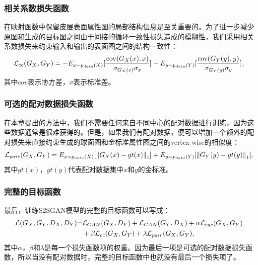 \subsubsection{相关系数损失函数}
在映射函数中保留皮层表面属性图的局部结构信息是至关重要的。为了进一步减少原图和生成的目标图之间由于间接的循环一致性损失造成的模糊性，我们采用相关系数损失来约束输入和输出的表面图之间的结构一致性：
\begin{equation}
	{{\cal L}_{cc}}({G_X},{G_Y}) =  - {E_{x\sim{p_{data}}(X)}}[\frac{{{\mathop{\rm cov}} ({G_X}(x),x)}}{{{\sigma _{{G_X}(x)}}{\sigma _x}}}] - {E_{y\sim{p_{data}}(Y)}}[\frac{{{\mathop{\rm cov}} ({G_Y}(y),y)}}{{{\sigma _{{G_Y}(y)}}{\sigma _y}}}],
\end{equation}
其中$cov$表示协方差，$\sigma$表示标准差。
	
\subsubsection{可选的配对数据损失函数}
在本章提出的方法中，我们不需要任何来自不同中心的配对数据进行训练，因为这些数据通常是很难获得的。但是，如果我们有配对数据，便可以增加一个额外的配对损失来直接约束生成的球面图和金标准属性图之间的vertex-wise的相似度：
\begin{equation}
	{{\cal L}_{pair}}({G_X},{G_Y}) = {E_{x\sim{p_{data}}(X)}}[{\left\| {{G_X}(x) - gt(x)} \right\|_1}] + {E_{y\sim{p_{data}}(Y)}}[{\left\| {{G_Y}(y) - gt(y)} \right\|_1}],
\end{equation}
其中$gt(x)$，$gt(y)$代表配对数据集中$x$和$y$的金标准。
	
\subsubsection{完整的目标函数} 
最后，训练S2SGAN模型的完整的目标函数可以写成：
\begin{equation}
\begin{split}
    {\cal L}({G_X},{G_Y},{D_X},{D_Y}){\rm{ = }} & {{\cal L}_{GAN}}({G_X},{D_Y}) + {{\cal L}_{GAN}}({G_Y},{D_X}) + \alpha {{\cal L}_{cyc}}({G_X},{G_Y})  \\
    & +\beta {{\cal L}_{cc}}({G_X},{G_Y}) + \lambda {{\cal L}_{pair}}({G_X},{G_Y}),
\end{split}
\end{equation}
其中$\alpha$，$\beta$和$\lambda$是每一个损失函数项的权重。因为最后一项是可选的配对数据损失函数，所以当没有配对数据时，完整的目标函数中也就没有最后一个损失项了。
	
